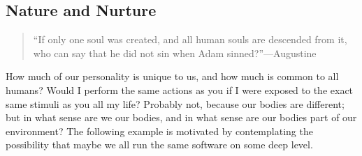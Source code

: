 \documentclass[runningheads]{llncs}
\begin{document}
\subsection{Nature and Nurture}

\begin{quote}
    ``If only one soul was created, and all human souls are descended from it,
    who can say that he did not sin when Adam sinned?''---Augustine \cite{augustine1993free}
\end{quote}

How much of our personality is unique to us, and how much is common to all humans?
Would I perform the same actions as you if I were exposed to the exact same stimuli as
you all my life? Probably not, because our bodies are different; but in what sense are
we our bodies, and in what sense are our bodies part of our environment?
The following example is motivated by contemplating the possibility that maybe we all
run the same software on some deep level.
\end{document}
